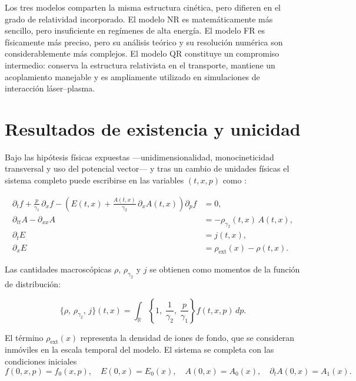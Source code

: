 \documentclass[11pt,a4paper,twoside,pdf]{article}
\numberwithin{equation}{section}
\begin{document}
Los tres modelos comparten la misma estructura cinética, pero difieren en el grado
de relatividad incorporado. El modelo NR es matemáticamente más sencillo, pero
insuficiente en regímenes de alta energía. El modelo FR es físicamente más preciso,
pero su análisis teórico y su resolución numérica son considerablemente más
complejos. El modelo QR constituye un compromiso intermedio: conserva la
estructura relativista en el transporte, mantiene un acoplamiento manejable y es
ampliamente utilizado en simulaciones de interacción láser–plasma.














\section{Resultados de existencia y unicidad}

Bajo las hipótesis físicas expuestas —unidimensionalidad,
monocineticidad transversal y uso del potencial vector— y tras un cambio de unidades físicas el sistema completo puede
escribirse en las variables $(t,x,p)$ como \cite{carrillo2006global}:

\begin{align}
\partial_t f
+ \frac{p}{\gamma_1}\,\partial_x f
- \left( E(t,x)
+ \frac{A(t,x)}{\gamma_2}\,\partial_x A(t,x) \right)\partial_p f &= 0, \label{eq:RM1}\\[0.4em]
\partial_{tt} A - \partial_{xx} A &= - \rho_{\gamma_2}(t,x)\,A(t,x), \label{eq:RM2}\\[0.4em]
\partial_t E &= j(t,x), \label{eq:RM3}\\[0.4em]
\partial_x E &= \rho_{\mathrm{ext}}(x) - \rho(t,x). \label{eq:RM4}
\end{align}

Las cantidades macroscópicas $\rho$, $\rho_{\gamma_2}$ y $j$ se obtienen como momentos
de la función de distribución:


\[
\{\rho,\,\rho_{\gamma_2},\,j\}(t,x)
= \int_{\mathbb{R}} \left\{ 1,\;\frac{1}{\gamma_2},\;\frac{p}{\gamma_1} \right\} f(t,x,p)\,dp.
\]






El término $\rho_{\mathrm{ext}}(x)$ representa la densidad de iones de fondo, que se
consideran inmóviles en la escala temporal del modelo. El sistema se completa con
las condiciones iniciales
\begin{equation}
f(0,x,p)=f_0(x,p), \quad
E(0,x)=E_0(x), \quad
A(0,x)=A_0(x), \quad
\partial_t A(0,x)=A_1(x).
\label{eq:IC}
\end{equation}
\end{document}

